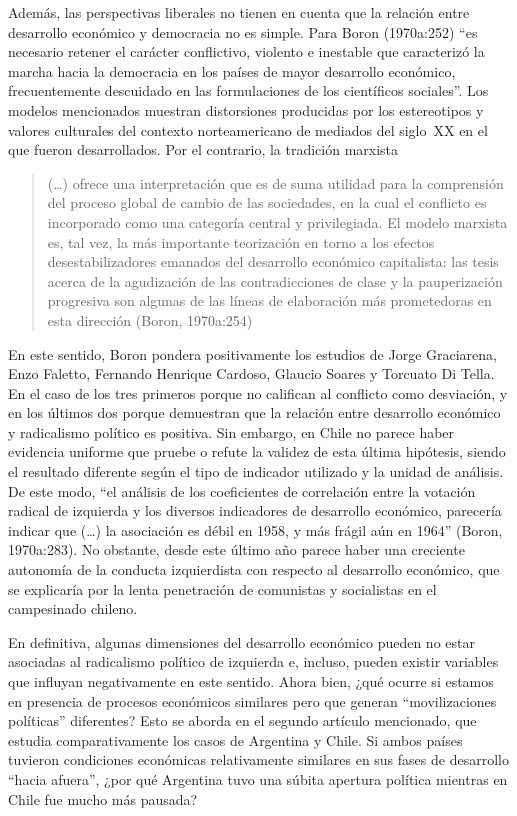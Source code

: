 Además, las perspectivas liberales no tienen en cuenta que la relación entre desarrollo económico y democracia no es simple. Para Boron (1970a:252) \enquote{es necesario retener el carácter conflictivo, violento e inestable que caracterizó la marcha hacia la democracia en los países de mayor desarrollo económico, frecuentemente descuidado en las formulaciones de los científicos sociales}. Los modelos mencionados muestran distorsiones producidas por los estereotipos y valores culturales del contexto norteamericano de mediados del siglo~XX en el que fueron desarrollados. Por el contrario, la tradición marxista

\begin{quote}
(\dots) ofrece una interpretación que es de suma utilidad para la comprensión del proceso global de cambio de las sociedades, en la cual el conflicto es incorporado como una categoría central y privilegiada. El modelo marxista es, tal vez, la más importante teorización en torno a los efectos desestabilizadores emanados del desarrollo económico capitalista: las tesis acerca de la agudización de las contradicciones de clase y la pauperización progresiva son algunas de las líneas de elaboración más prometedoras en esta dirección (Boron, 1970a:254)
\end{quote}

En este sentido, Boron pondera positivamente los estudios de Jorge Graciarena, Enzo Faletto, Fernando Henrique Cardoso, Glaucio Soares y Torcuato Di Tella. En el caso de los tres primeros porque no califican al conflicto como desviación, y en los últimos dos porque demuestran que la relación entre desarrollo económico y radicalismo político es positiva. Sin embargo, en Chile no parece haber evidencia uniforme que pruebe o refute la validez de esta última hipótesis, siendo el resultado diferente según el tipo de indicador utilizado y la unidad de análisis. De este modo, \enquote{el análisis de los coeficientes de correlación entre la votación radical de izquierda y los diversos indicadores de desarrollo económico, parecería indicar que (\dots) la asociación es débil en 1958, y más frágil aún en 1964} (Boron, 1970a:283). No obstante, desde este último año parece haber una creciente autonomía de la conducta izquierdista con respecto al desarrollo económico, que se explicaría por la lenta penetración de comunistas y socialistas en el campesinado chileno.

En definitiva, algunas dimensiones del desarrollo económico pueden no estar asociadas al radicalismo político de izquierda e, incluso, pueden existir variables que influyan negativamente en este sentido. Ahora bien, ¿qué ocurre si estamos en presencia de procesos económicos similares pero que generan \enquote{movilizaciones políticas} diferentes? Esto se aborda en el segundo artículo mencionado, que estudia comparativamente los casos de Argentina y Chile. Si ambos países tuvieron condiciones económicas relativamente similares en sus fases de desarrollo \enquote{hacia afuera}, ¿por qué Argentina tuvo una súbita apertura política mientras en Chile fue mucho más pausada?

